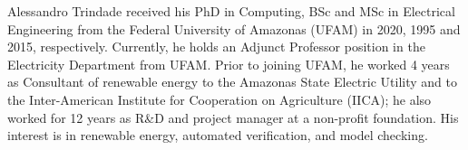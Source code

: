 \documentclass[10pt,journal,compsoc]{IEEEtran}
\begin{document}

{}
%
%
%
% 
\begin{IEEEbiography}
    {Alessandro Trindade}
received his PhD in Computing, BSc and MSc in Electrical Engineering from the Federal University of Amazonas (UFAM) in 2020, 1995 and 2015, respectively. Currently, he holds an Adjunct Professor position in the Electricity Department from UFAM. Prior to joining UFAM, he worked 4 years as Consultant of renewable energy to the Amazonas State Electric Utility and to the Inter-American Institute for Cooperation on Agriculture (IICA); he also worked for 12 years as R\&D and project manager at a non-profit foundation. His interest is in renewable energy, automated verification, and model checking.
\end{IEEEbiography}
\end{document}
